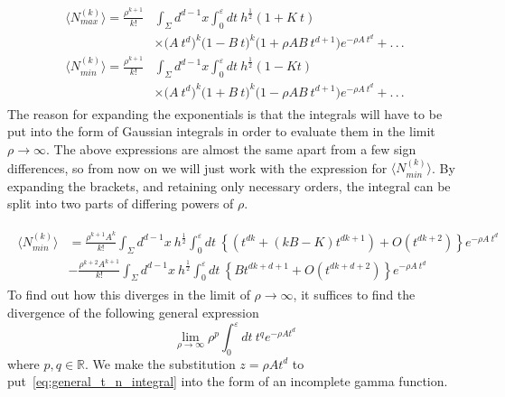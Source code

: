 \documentclass[12pt]{article}
\newcommand{\be}{\begin{equation}}
\newcommand{\ee}{\end{equation}}
\begin{document}
\begin{gather}\label{eq:nmax_and_eq:nmin_volume_expo_expanded}
\begin{aligned}
\langle N_{max}^{(k)}\rangle = \frac{\rho^{k+1}}{k!} & \int_{\Sigma}d^{d-1}x\int_{0}^{\varepsilon}dt\:
h^{\frac{1}{2}}\left(1+
K\: t\right)
 \\
 & \times \Big( A\: t^d \Big)^k 
 \Big( 1 - B\: t \Big)^k
 \Big( 1 + \rho A B\: t^{d+1} \Big)
 e^{-\rho A\: t^d} + .\,.\,.
\\
\langle N_{min}^{(k)}\rangle = \frac{\rho^{k+1}}{k!} & \int_{\Sigma}d^{d-1}x\int_{0}^{\varepsilon}dt\:
h^{\frac{1}{2}}\left(1-
Kt\right)
 \\
 & \times \Big( A\: t^d \Big)^k 
 \Big( 1 + B\: t \Big)^k
  \Big( 1 - \rho A B\: t^{d+1} \Big)
 e^{-\rho A\: t^d} + .\,.\,.
\end{aligned}
\end{gather}
The reason for expanding the exponentials is that the integrals will have to be put into the form of Gaussian integrals in order to evaluate them in the limit $\rho\rightarrow\infty$. The above expressions are almost the same apart from a few sign differences, so from now on we will just work with the expression for $\langle N_{min}^{(k)}\rangle$. By expanding the brackets, and retaining only necessary orders, the integral can be split into two parts of differing powers of $\rho$.

\begin{gather}\label{eq:n_min_different_rho_terms}
\begin{aligned}
\langle N_{min}^{(k)}\rangle & = \frac{\rho^{k+1}A^k}{k!}\int_{\Sigma}d^{d-1}x\: h^{\frac{1}{2}}\int_{0}^{\varepsilon}dt\:
\left\lbrace \left( t^{dk} + \left(kB-K \right)t^{dk+1}\right) + O\left(t^{dk+2}\right) \right\rbrace e^{-\rho A\: t^d}
 \\
 & - \frac{\rho^{k+2}A^{k+1}}{k!}\int_{\Sigma}d^{d-1}x\: h^{\frac{1}{2}}\int_{0}^{\varepsilon}dt\:
\left\lbrace Bt^{dk+d+1} + O\left(t^{dk+d+2}\right) \right\rbrace e^{-\rho A\: t^d}
\end{aligned}
\end{gather}
To find out how this diverges in the limit of $\rho \rightarrow\infty$, it suffices to find the divergence of the following general expression
\be\label{eq:general_t_n_integral}
\lim_{\rho\rightarrow\infty}\rho^{p}\int_{0}^{\varepsilon}dt\
t^{q}e^{-\rho At^{d}}
\ee
where $p,q \in \mathbb{R}$. We make the substitution $z=\rho At^{d}$ to put~\eqref{eq:general_t_n_integral} into the form of an incomplete gamma function.
\end{document}
